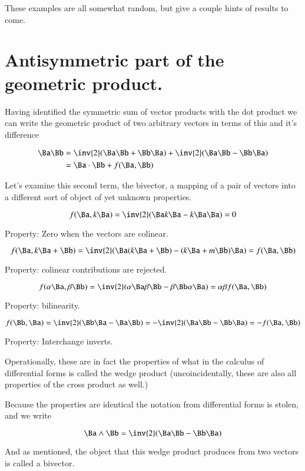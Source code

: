 \documentclass{article}      %
\begin{document}
These examples are all somewhat random, but give a couple hints of results to come.

\section{ Antisymmetric part of the geometric product. }

Having identified the symmetric sum of vector products with the dot product we can write the geometric product of two arbitrary vectors
in terms of this and it's difference

\begin{align*}
\Ba \Bb 
&= \inv{2}(\Ba \Bb + \Bb \Ba) + \inv{2}(\Ba \Bb - \Bb \Ba) \\
&= \Ba \cdot \Bb + f(\Ba, \Bb) \\
\end{align*}

Let's examine this second term, the bivector, a mapping of a pair of vectors into a different sort of object of yet unknown properties.

\[
f(\Ba, k\Ba) = \inv{2}(\Ba k\Ba - k\Ba \Ba) = 0
\]

Property: Zero when the vectors are colinear.

\[
f(\Ba, k\Ba + \Bb) = \inv{2}(\Ba (k\Ba + \Bb) - (k\Ba + m\Bb)\Ba) = f(\Ba, \Bb)
\]

Property: colinear contributions are rejected.

\[
f(\alpha \Ba, \beta \Bb) = \inv{2}(\alpha \Ba \beta \Bb - \beta \Bb \alpha \Ba) = \alpha \beta f(\Ba, \Bb)
\]

Property: bilinearity.

\[
f(\Bb, \Ba) 
= \inv{2}(\Bb \Ba - \Ba\Bb) 
= -\inv{2}(\Ba \Bb - \Bb\Ba) 
= -f(\Ba, \Bb) 
\]

Property: Interchange inverts.

Operationally, these are in fact the properties of what in the calculus of differential forms is called the wedge product (uncoincidentally, these are also all properties of the cross product as well.)

Because the properties are identical the notation from differential forms is stolen, and we write

\begin{equation}\label{eqn:wedge}
\Ba \wedge \Bb = \inv{2}(\Ba \Bb - \Bb \Ba)
\end{equation}

And as mentioned, the object that this 
wedge product produces from two vectors is called a bivector.
\end{document}
